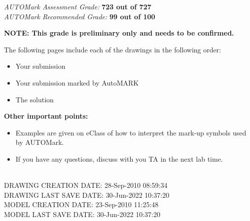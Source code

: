 \documentclass{article}
\begin{document}
\begin{center}
 \large \emph {{AUTOMark Assessment Grade:}}
 \large \textbf{723 out of 727}\\[0.5 cm] %
 \large \emph {{AUTOMark Recommended Grade:}}
 \large \textbf{99 out of 100}\\[0.5 cm] %
\end{center}
\vspace{1.0\baselineskip} %
\begin{flushleft}
\textbf{NOTE: This grade is preliminary only and needs to be confirmed.}\\[1.0 cm] %
\end{flushleft}
The following pages include each of the drawings in the following order:
\begin{itemize}
\itemsep0em %
	\item Your submission 
	\item Your submission marked by AutoMARK
	\item The solution
\end{itemize}
%
\textbf{Other important points:}
\begin{itemize}
\itemsep0em %
	\item Examples are given on eClass of how to interpret the mark-up symbols used by AUTOMark.
	\item If you have any questions, discuss with you TA in the next lab time.
\end{itemize}

\begin{flushleft} \large
\\[0.5cm]
DRAWING CREATION DATE: {28-Sep-2010 08:59:34}\\
DRAWING LAST SAVE DATE: {30-Jun-2022 10:37:20}\\
MODEL CREATION DATE: {23-Sep-2010 11:25:48}\\
MODEL LAST SAVE DATE: {30-Jun-2022 10:37:20}\\
\end{flushleft}
\end{document}

